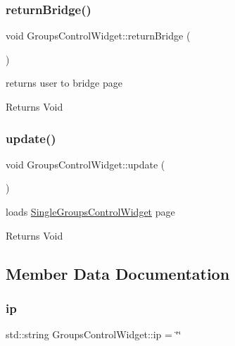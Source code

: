 \subsubsection{\texorpdfstring{return\+Bridge()}{returnBridge()}}
{\footnotesize\ttfamily void Groups\+Control\+Widget\+::return\+Bridge (\begin{DoxyParamCaption}{ }\end{DoxyParamCaption})\hspace{0.3cm}{\ttfamily [private]}}



returns user to bridge page 

\begin{DoxyReturn}{Returns}
Void 
\end{DoxyReturn}
\mbox{\label{class_groups_control_widget_a6b7f7244d67dcdc7e1e946e0e1959f8d}} 
\subsubsection{\texorpdfstring{update()}{update()}}
{\footnotesize\ttfamily void Groups\+Control\+Widget\+::update (\begin{DoxyParamCaption}{ }\end{DoxyParamCaption})}



loads \hyperlink{class_single_groups_control_widget}{Single\+Groups\+Control\+Widget} page 

\begin{DoxyReturn}{Returns}
Void 
\end{DoxyReturn}


\subsection{Member Data Documentation}
\mbox{\label{class_groups_control_widget_abf7a784bfb01b064e2bb2064c8e3e3a3}} 
\subsubsection{\texorpdfstring{ip}{ip}}
{\footnotesize\ttfamily std\+::string Groups\+Control\+Widget\+::ip = \char`\"{}\char`\"{}\hspace{0.3cm}{\ttfamily [private]}}

